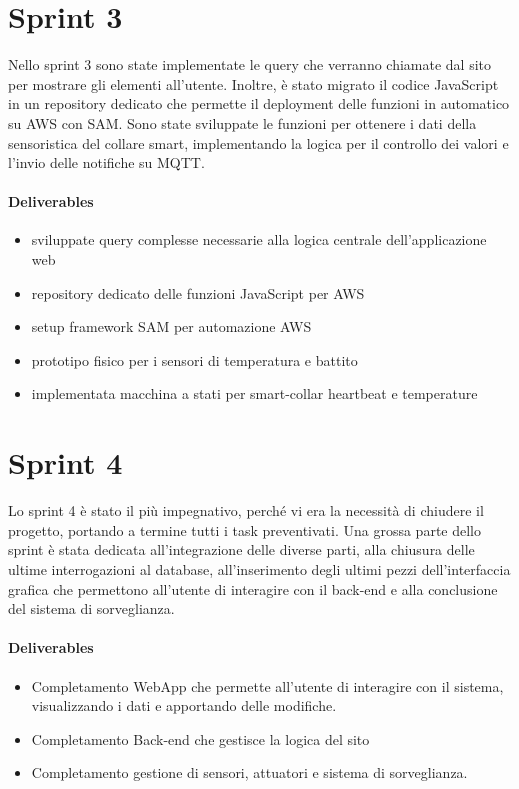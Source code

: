 \section{Sprint 3}
Nello sprint 3 sono state implementate le query che verranno chiamate dal sito per mostrare gli elementi all'utente. Inoltre, è stato migrato il codice JavaScript in un repository dedicato che permette il deployment delle funzioni in automatico su AWS con SAM. Sono state sviluppate le funzioni per ottenere i dati della sensoristica del collare smart, implementando la logica per il controllo dei valori e l'invio delle notifiche su MQTT.
\paragraph{Deliverables}
\begin{itemize}
    \item sviluppate query complesse necessarie alla logica centrale dell'applicazione web
    \item repository dedicato delle funzioni JavaScript per AWS
    \item setup framework SAM per automazione AWS
    \item prototipo fisico per i sensori di temperatura e battito
    \item implementata macchina a stati per smart-collar heartbeat e temperature
\end{itemize}

\section{Sprint 4}
Lo sprint 4 è stato il più impegnativo,  perché vi era la necessità di chiudere il progetto, portando a termine tutti i task preventivati.
Una grossa parte dello sprint è stata dedicata all'integrazione delle diverse parti, alla chiusura delle ultime interrogazioni al database, all'inserimento degli ultimi pezzi dell'interfaccia grafica che permettono all'utente di interagire con il back-end e alla conclusione del sistema di sorveglianza.
\paragraph{Deliverables}
\begin{itemize}
    \item Completamento WebApp che permette all'utente di interagire con il sistema, visualizzando i dati e apportando delle modifiche.
    \item Completamento Back-end che gestisce la logica del sito
    \item Completamento gestione di sensori, attuatori e sistema di sorveglianza.
\end{itemize}



